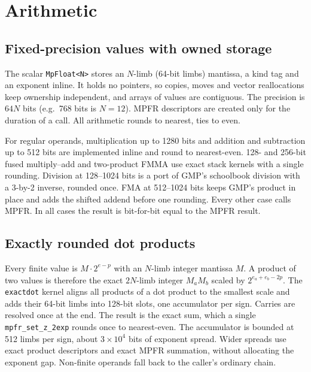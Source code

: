 \documentclass[11pt]{article}
\newcommand{\code}[1]{\texttt{#1}}
\begin{document}
\section{Arithmetic}
\label{sec:arith}

\subsection{Fixed-precision values with owned storage}

The scalar \code{MpFloat<N>} stores an $N$-limb (64-bit limbs) mantissa, a
kind tag and an exponent inline. It holds no pointers, so copies, moves and
vector reallocations keep ownership independent, and arrays of values are
contiguous. The precision is $64N$ bits (e.g.\ 768 bits is $N=12$). MPFR
\cite{Fousse2007} descriptors are created only for the duration of a call. All
arithmetic rounds to nearest, ties to even.

For regular operands, multiplication up to 1280 bits and addition and
subtraction up to 512 bits are implemented inline and round to nearest-even.
128- and 256-bit fused multiply--add and two-product FMMA use exact stack
kernels with a single rounding. Division at 128--1024 bits is a port of GMP's
schoolbook division with a 3-by-2 inverse, rounded once. FMA at 512--1024
bits keeps GMP's product in place and adds the shifted addend before one
rounding. Every other case calls MPFR. In all cases the result is
bit-for-bit equal to the MPFR result.

\subsection{Exactly rounded dot products}

Every finite value is $M\cdot 2^{e-p}$ with an $N$-limb integer mantissa $M$.
A product of two values is therefore the exact $2N$-limb integer $M_a M_b$
scaled by $2^{e_a+e_b-2p}$. The \code{exactdot} kernel aligns all products
of a dot product to the smallest scale and adds their 64-bit limbs into
128-bit slots, one accumulator per sign. Carries are resolved once at the end.
The result is the exact sum, which a single \code{mpfr\_set\_z\_2exp} rounds
once to nearest-even. The accumulator is bounded at 512 limbs per sign,
about $3\times10^4$ bits of exponent spread. Wider spreads use exact product
descriptors and exact MPFR summation, without allocating the exponent gap.
Non-finite operands fall back to the caller's ordinary chain.
\end{document}
